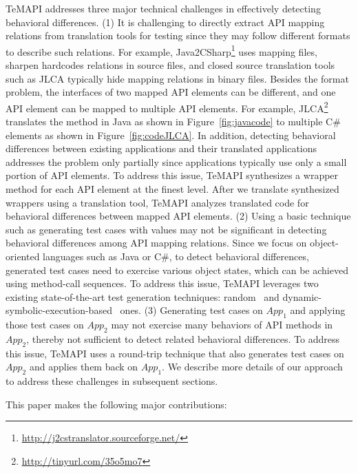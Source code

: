 TeMAPI addresses three major technical challenges in effectively detecting behavioral differences. (1) It is challenging to directly extract API mapping relations from translation tools for testing since they may follow different formats to describe such relations. For example, Java2CSharp\footnote{\url{http://j2cstranslator.sourceforge.net/}} uses mapping files, sharpen hardcodes relations in source files, and closed source translation tools such as JLCA typically hide mapping relations in binary files. Besides the format problem, the interfaces of two mapped API elements can be different, and one API element can be mapped to multiple API elements. For example, JLCA\footnote{\url{http://tinyurl.com/35o5mo7}} translates the  method in Java as shown in Figure~\ref{fig:javacode} to multiple C\# elements as shown in Figure~\ref{fig:codeJLCA}. In addition, detecting behavioral differences between existing applications and their translated applications addresses the problem only partially since applications typically use only a small portion of API elements. To address this issue, TeMAPI synthesizes a wrapper method for each API element at the finest level. After we translate synthesized wrappers using a translation tool, TeMAPI analyzes translated code for behavioral differences between mapped API elements. (2) Using a basic technique such as generating test cases with  values may not be significant in detecting behavioral differences among API mapping relations. Since we focus on object-oriented languages such as Java or C\#, to detect behavioral differences, generated test cases need to exercise various object states, which can be achieved using method-call sequences. To address this issue, TeMAPI leverages two existing state-of-the-art test generation techniques: random~\cite{pacheco2007feedback} and dynamic-symbolic-execution-based~\cite{koushik:cute, godefroid:dart, tillmann2008pex} ones. (3) Generating test cases on $App_1$ and applying those test cases on $App_2$ may not exercise many behaviors of API methods in $App_2$, thereby not sufficient to detect related behavioral differences. To address this issue, TeMAPI uses a round-trip technique that also generates test cases on $App_2$ and applies them back on $App_1$. We describe more details of our approach to address these challenges in subsequent sections.

This paper makes the following major contributions:

